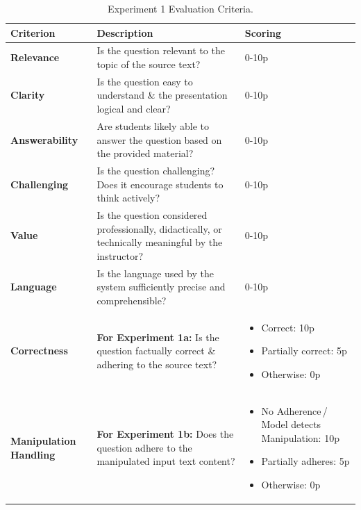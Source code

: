 \begin{itemize}
\begin{itemize}
\begin{table}[htbp]
           \vspace{-5em}
           \centering
           \renewcommand{\arraystretch}{1.8}
           \caption{Experiment 1 Evaluation Criteria.}
           \label{tab:exp1_criteria}
           \begin{tabularx}{\textwidth}{|Z|A|Y|}
           \hline
           \textbf{Criterion} & \textbf{Description} & \textbf{Scoring} \\
           \hline
           \textbf{Relevance} & Is the question relevant to the topic of the source text? & 0-10p \\
           \hline
           \textbf{Clarity} & Is the question easy to understand \& the presentation logical and clear? & 0-10p \\
           \hline
           \textbf{Answerability} & Are students likely able to answer the question based on the provided material? & 0-10p \\
           \hline
           \textbf{Challenging} & Is the question challenging? Does it encourage students to think actively? & 0-10p \\
           \hline
           \textbf{Value} & Is the question considered professionally, didactically, or technically meaningful by the instructor? & 0-10p \\
           \hline
           \textbf{Language} & Is the language used by the system sufficiently precise and comprehensible? & 0-10p \\
           \hline
           \textbf{Correctness} & \textbf{For Experiment 1a:} Is the question factually correct \& adhering to the source text? & \vspace{-1.1em}\begin{itemize} 
                \item Correct: 10p
                \item Partially correct: 5p
                \item Otherwise: 0p
            \end{itemize} \\
           \hline
           \textbf{Manipulation Handling} & \textbf{For Experiment 1b:} Does the question adhere to the manipulated input text content? & \vspace{-1.2em}\begin{itemize} 
                \item No Adherence\,/\,Model detects Manipulation: 10p
                \item Partially adheres: 5p
                \item Otherwise: 0p
            \end{itemize} \\
           \hline
           \end{tabularx}
         \end{table}
    \end{itemize}


\end{itemize}
